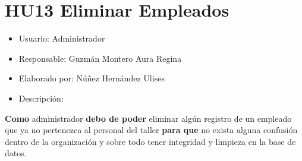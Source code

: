 \section{HU13 Eliminar Empleados}
\begin{itemize}
	\item Usuario: Administrador
	\item Responsable: Guzmán Montero Aura Regina
	\item Elaborado por: Núñez Hernández Ulises
	\item Descripción:\\
\end{itemize}

\textbf{Como} administrador \textbf{debo de poder} eliminar algún registro de un empleado que ya no pertenezca al personal del taller \textbf{para que} no exista alguna confusión dentro de la organización y sobre todo tener integridad y limpieza en la base de datos.